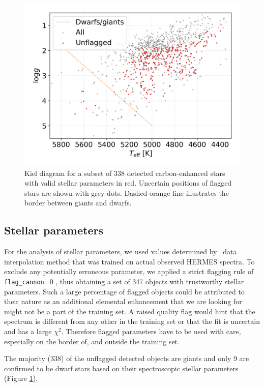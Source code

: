 \begin{figure}
	\centering
	\includegraphics[width=\columnwidth]{Kiel_diagram.png}
	\caption{Kiel diagram for a subset of 338 detected carbon-enhanced stars with valid stellar parameters in red. Uncertain positions of flagged stars are shown with grey dots. Dashed orange line illustrates the border between giants and dwarfs.}
	\label{fig:kiel_plot}
\end{figure}

\subsection{Stellar parameters}
\label{sec:cannon_params}
For the analysis of stellar parameters, we used values determined by \TC\ data interpolation method that was trained on actual observed HERMES spectra. To exclude any potentially erroneous parameter, we applied a strict flagging rule of \texttt{flag\_cannon}=0 \citep[an extensive description of flagging procedure can be found in][]{buder2018}, thus obtaining a set of 347 objects with trustworthy stellar parameters. Such a large percentage of flagged objects could be attributed to their nature as an additional elemental enhancement that we are looking for might not be a part of the training set. A raised quality flag would hint that the spectrum is different from any other in the training set or that the fit is uncertain and has a large $\chi^2$. Therefore flagged parameters have to be used with care, especially on the border of, and outside the training set.

The majority (338) of the unflagged detected objects are giants and only 9 are confirmed to be dwarf stars based on their spectroscopic stellar parameters (Figure \ref{fig:kiel_plot}).

